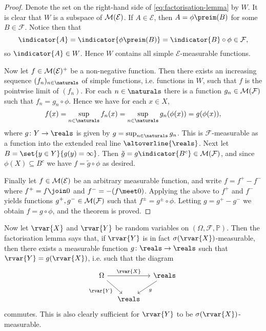 \documentclass[article, a4paper, 11pt, oneside]{memoir}
\numberwithin{equation}{chapter}
\newcommand{\calE}{\mathcal{E}}
\newcommand{\calF}{\mathcal{F}}
\renewcommand{\P}{\mathbb{P}}
\begin{document}
\begin{proof}
    Denote the set on the right-hand side of \cref{eq:factorisation-lemma} by $W$. It is clear that $W$ is a subspace of $\meas{\calE}$. If $A \in \calE$, then $A = \phi\preim(B)$ for some $B \in \calF$. Notice then that
    \begin{equation*}
        \indicator{A}
            = \indicator{\phi\preim(B)}
            = \indicator{B} \circ \phi
            \in \calF,
    \end{equation*}
    so $\indicator{A} \in W$. Hence $W$ contains all simple $\calE$-measurable functions.
    
    Now let $f \in \meas{\calE}^+$ be a non-negative function. Then there exists an increasing sequence $(f_n)_{n\in\naturals}$ of simple functions, i.e. functions in $W$, such that $f$ is the pointwise limit of $(f_n)$. For each $n\in\naturals$ there is a function $g_n \in \meas{\calF}$ such that $f_n = g_n \circ \phi$. Hence we have for each $x \in X$,
    \begin{equation*}
        f(x)
            = \sup_{n\in\naturals} f_n(x)
            = \sup_{n\in\naturals} g_n(\phi(x))
            = g(\phi(x)),
    \end{equation*}
    where $g \colon Y \to \reals$ is given by $g = \sup_{n\in\naturals}g_n$. This is $\calF$-measurable as a function into the extended real line $\altoverline{\reals}$. Next let $B = \set{y \in Y}{g(y) = \infty}$. Then $\tilde{g} = g \indicator{B^c} \in \meas{\calF}$, and since $\phi(X) \subseteq B^c$ we have $f = \tilde{g} \circ \phi$ as desired.

    Finally let $f \in \meas{\calE}$ be an arbitrary measurable function, and write $f = f^+ - f^-$ where $f^+ = f \join 0$ and $f^- = -(f \meet 0)$. Applying the above to $f^+$ and $f^-$ yields functions $g^+, g^- \in \meas{\calF}$ such that $f^\pm = g^\pm \circ \phi$. Letting $g = g^+ - g^-$ we obtain $f = g \circ \phi$, and the theorem is proved.
\end{proof}
%
Now let $\rvar{X}$ and $\rvar{Y}$ be random variables on $(\Omega,\calF,\P)$. Then the factorisation lemma says that, if $\rvar{Y}$ is in fact $\sigma(\rvar{X})$-measurable, then there exists a measurable function $g \colon \reals \to \reals$ such that $\rvar{Y} = g(\rvar{X})$, i.e. such that the diagram
%
\begin{equation*}
    \begin{tikzcd}[column sep=1em]
        \Omega
            \ar[rr, "\rvar{X}"]
            \ar[dr, "\rvar{Y}", swap]
        && \reals
            \ar[dl, "g"] \\
        & \reals
    \end{tikzcd}
\end{equation*}
%
commutes. This is also clearly sufficient for $\rvar{Y}$ to be $\sigma(\rvar{X})$-measurable.
\end{document}

